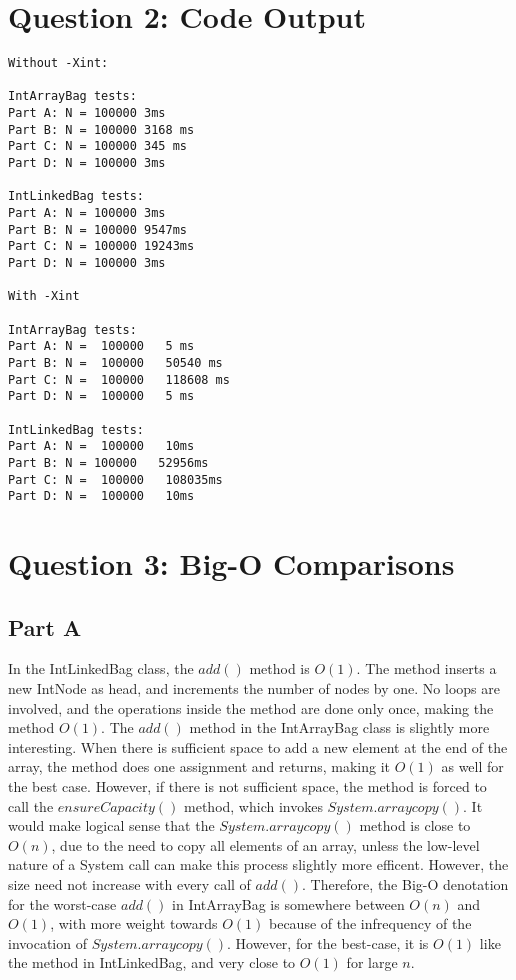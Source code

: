 \documentclass[12pt]{article} %
\begin{document}
\section{Question 2: Code Output}
\begin{lstlisting}
Without -Xint:

IntArrayBag tests:
Part A: N = 100000 3ms
Part B: N = 100000 3168 ms
Part C: N = 100000 345 ms
Part D: N = 100000 3ms

IntLinkedBag tests:
Part A: N = 100000 3ms
Part B: N = 100000 9547ms
Part C: N = 100000 19243ms
Part D: N = 100000 3ms

With -Xint

IntArrayBag tests:
Part A: N =  100000   5 ms
Part B: N =  100000   50540 ms
Part C: N =  100000   118608 ms
Part D: N =  100000   5 ms

IntLinkedBag tests:
Part A: N =  100000   10ms
Part B: N = 100000   52956ms
Part C: N =  100000   108035ms
Part D: N =  100000   10ms
\end{lstlisting}

\section{Question 3: Big-O Comparisons}
\subsection{Part A}
In the IntLinkedBag class, the $add()$ method is $O(1)$. The method inserts a new IntNode as head, and increments the number of nodes by one. No loops are involved, and the operations inside the method are done only once, making the method $O(1)$. The $add()$ method in the IntArrayBag class is slightly more interesting. When there is sufficient space to add a new element at the end of the array, the method does one assignment and returns, making it $O(1)$ as well for the best case. However, if there is not sufficient space, the method is forced to call the $ensureCapacity()$ method, which invokes $System.arraycopy()$. It would make logical sense that the $System.arraycopy()$ method is close to $O(n)$, due to the need to copy all elements of an array, unless the low-level nature of a System call can make this process slightly more efficent. However, the size need not increase with every call of $add()$. Therefore, the Big-O denotation for the worst-case $add()$ in IntArrayBag is somewhere between $O(n)$ and $O(1)$, with more weight towards $O(1)$ because of the infrequency of the invocation of $System.arraycopy()$. However, for the best-case, it is $O(1)$ like the method in IntLinkedBag, and very close to $O(1)$ for large $n$. 
\end{document}
